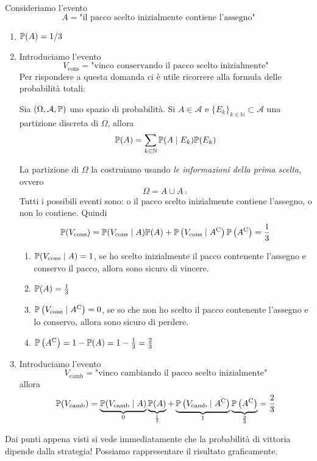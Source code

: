 Consideriamo l'evento
\begin{equation*}
	A=\text{"il pacco scelto inizialmente contiene l'assegno"}
\end{equation*}
\begin{enumerate}
	\item $\mathbb{P}(A) =1/3$
	\item Introduciamo l'evento
	\begin{equation*}
		V_{\text{cons}} =\text{"vinco conservando il pacco scelto inizialmente"}
	\end{equation*}
	Per rispondere a questa domanda ci è utile ricorrere alla formula delle probabilità totali:
	\begin{theorem}
		Sia $(\Omega ,\mathcal{A} ,\mathbb{P})$ uno spazio di probabilità. Si $A\in \mathcal{A}$ e $\{E_{k}\}_{k\in \mathbb{N}} \subset \mathcal{A}$ una partizione discreta di $\Omega $, allora
		\begin{equation*}
			\mathbb{P}(A) =\sum\limits _{k\in \mathbb{N}}\mathbb{P}(A\mid E_{k})\mathbb{P}(E_{k})
		\end{equation*}
	\end{theorem}
	La partizione di $\Omega $ la costruiamo usando \textit{le informazioni della prima scelta}, ovvero
	\begin{equation*}
		\Omega =A\cup A\comp
	\end{equation*}
	Tutti i possibili eventi sono: o il pacco scelto inizialmente contiene l'assegno, o non lo contiene. Quindi
	\begin{equation*}
		\mathbb{P}(V_{\text{cons}}) =\mathbb{P}(V_{\text{cons}} \mid A)\mathbb{P}(A) +\mathbb{P}\left(V_{\text{cons}} \mid A^{\mathrm{C}}\right)\mathbb{P}\left(A^{\mathrm{C}}\right) =\frac{1}{3}
	\end{equation*}
	\begin{enumerate}
		\item $\mathbb{P}(V_{\text{cons}} \mid A) =1$, se ho scelto inizialmente il pacco contenente l'assegno e conservo il pacco, allora sono sicuro di vincere.
		\item $\mathbb{P}(A) =\frac{1}{3}$
		\item $\mathbb{P}\left(V_{\text{cons}} \mid A^{\mathrm{C}}\right) =0$, se so che non ho scelto il pacco contenente l'assegno e lo conservo, allora sono sicuro di perdere.
		\item $\mathbb{P}\left(A^{\mathrm{C}}\right) =1-\mathbb{P}(A) =1-\frac{1}{3} =\frac{2}{3}$
	\end{enumerate}
	\item Introduciamo l'evento
	\begin{equation*}
		V_{\text{camb}} =\text{"vinco cambiando il pacco scelto inizialmente"}
	\end{equation*}
	allora
	\begin{equation*}
		\mathbb{P}(V_{\text{camb}}) =\underbrace{\mathbb{P}(V_{\text{camb}} \mid A)}_{0}\underbrace{\mathbb{P}(A)}_{\frac{1}{3}} +\underbrace{\mathbb{P}\left(V_{\text{camb}} \mid A^{\mathrm{C}}\right)}_{1}\underbrace{\mathbb{P}\left(A^{\mathrm{C}}\right)}_{\frac{2}{3}} =\frac{2}{3}
	\end{equation*}
\end{enumerate}
Dai punti appena visti si vede immediatamente che la probabilità di vittoria dipende dalla strategia! Possiamo rappresentare il risultato graficamente.


